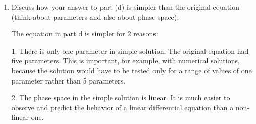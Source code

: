 \documentclass[11pt,answers]{exam}
\begin{document}
\begin{questions}
\begin{enumerate}
\begin{solution}
\end{solution}

\item Discuss how your answer to part (d) is simpler than the original equation (think about parameters and also about phase space).

\begin{solution}
The equation in part d is simpler for 2 reasons:

1. There is only one parameter in simple solution. The original equation had five parameters. This is important, for example, with numerical solutions, because the solution would have to be tested only for a range of values of one parameter rather than 5 parameters.

2. The phase space in the simple solution is linear. It is much easier to observe and predict the behavior  of a linear differential equation than a non-linear one.
\end{solution}

\end{enumerate}


\end{questions}
\end{document}
